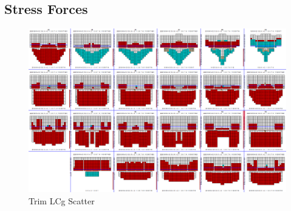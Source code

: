\documentclass[runningheads]{llncs}
\begin{document}
 


\subsection{Stress Forces}
 
 
 
 \begin{figure}[h!]
\begin{center}
  \includegraphics[scale=0.3]{figures/B31condition} 
\end{center}
\caption{Trim LCg Scatter}
\label{fig:trimlcgscatter}
\end{figure}

 
 
\end{document}
